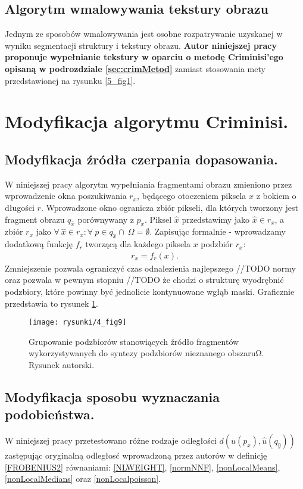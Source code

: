 \documentclass[12pt, twoside, openany]{report}
\theoremstyle{definition}
\begin{document}
\subsection{Algorytm wmalowywania tekstury obrazu}
Jednym ze sposobów wmalowywania jest osobne rozpatrywanie uzyskanej w wyniku segmentacji struktury i tekstury obrazu. \textbf{Autor niniejszej pracy proponuje wypełnianie tekstury w oparciu o metodę Criminisi'ego opisaną w podrozdziale \ref{sec:crimMetod}} zamiast stosowania mety przedstawionej na rysunku \ref{5_fig1}.
\section{Modyfikacja algorytmu Criminisi.}
\label{ssec:crimMod}
\subsection{Modyfikacja źródła czerpania dopasowania.}
\label{ssec:crimModSource}
W niniejszej pracy algorytm wypełniania fragmentami obrazu zmieniono przez wprowadzenie okna poszukiwania $r_x$, będącego otoczeniem piksela $x$ z bokiem o długości $r$. Wprowadzone okno ogranicza zbiór pikseli, dla których tworzony jest fragment obrazu $q_{\hat{x}}$ porównywany z $p_{x}$.
Piksel $\hat{x}$ przedstawimy jako $\hat{x} \in r_x$, a zbiór $r_x$ jako 
$\forall \ \hat{x} \in r_x: \forall \ p \in q_{\hat{x}} \cap \ \Omega = \emptyset$. Zapisując formalnie - wprowadzamy dodatkową funkcję $f_r$ tworzącą dla każdego piksela $x$ podzbiór $r_x$:
\begin{align}
r_x = f_r(x).
\end{align}
Zmniejszenie pozwala ograniczyć czas odnalezienia najlepszego //TODO normy oraz pozwala w pewnym stopniu //TODO że chodzi o strukturę wyodrębnić podzbiory, które powinny być jednolicie kontynuowane wgłąb maski. Graficznie przedstawia to rysunek \ref{4_fig9}.
\begin{figure}[!h]
	\centering
	\texttt{[image: rysunki/4\_fig9]}
	\caption{Grupowanie podzbiorów stanowiących źródło fragmentów wykorzystywanych do syntezy podzbiorów nieznanego obszaru$\boldsymbol{\mathrm{\Omega }}$. Rysunek autorski.}
\label{4_fig9}
\end{figure}
\subsection{Modyfikacja sposobu wyznaczania podobieństwa.}
\label{ssec:modDistForCrim}
W niniejszej pracy przetestowano różne rodzaje odległości $d\left( u(p_x), \hat{u} (q_{\hat{y}}) \right)$  zastępując oryginalną odległosć wprowadzoną przez autorów w \cite{criminisi2004region} definicję \eqref{FROBENIUS2} równaniami: \eqref{NLWEIGHT}, \eqref{normNNF}, \eqref{nonLocalMeans}, \eqref{nonLocalMedians} oraz \eqref{nonLocalpoisson}.
\end{document}
